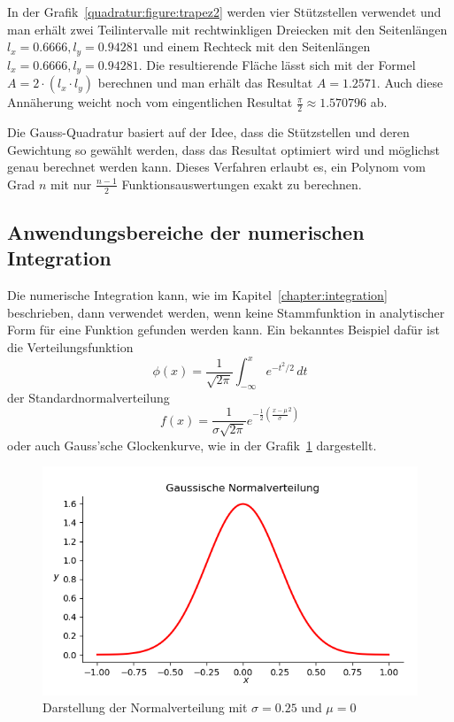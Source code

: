 \noindent
In der Grafik~\ref{quadratur:figure:trapez2} werden vier Stützstellen verwendet und man erhält zwei Teilintervalle mit 
rechtwinkligen Dreiecken mit den Seitenlängen $l_{x}=0.6666, l_{y}=0.94281$ und einem Rechteck mit den Seitenlängen
$l_{x}=0.6666, l_{y}=0.94281$. 
Die resultierende Fläche lässt sich mit der Formel $A= 2\cdot (l_{x} \cdot l_{y})$ berechnen 
und man erhält das Resultat $A=1.2571$.
Auch diese Annäherung weicht noch vom eingentlichen Resultat $\frac{\pi}{2} \approx 1.570796$ ab.

\noindent
Die Gauss-Quadratur basiert auf der Idee, dass die Stützstellen und deren Gewichtung so gewählt werden,
dass das Resultat optimiert wird und möglichst genau berechnet werden kann.
Dieses Verfahren erlaubt es, ein Polynom vom Grad $n$ mit nur $\frac{n-1}{2}$
Funktionsauswertungen exakt zu berechnen.

\newpage

\subsection{Anwendungsbereiche der numerischen Integration \label{quadratur:subsection:anwendungsbereiche}}
Die numerische Integration kann, wie im Kapitel~\ref{chapter:integration} beschrieben, dann verwendet
werden, wenn keine Stammfunktion in analytischer Form für eine Funktion gefunden werden kann.
Ein bekanntes Beispiel dafür ist die Verteilungsfunktion
\begin{equation}
    \phi(x) 
    =
    \frac{1}{\sqrt{2\pi}}
    \int_{-\infty}^x e^{-t^2/2}\,dt
\end{equation}
\noindent
der Standardnormalverteilung
\begin{equation}
    f(x)
    = 
    \frac{1}{\sigma \sqrt{2\pi}}e^{-\frac{1}{2}(\frac{x-\mu}{\sigma}^{2})}
\end{equation}
\noindent 
oder auch Gauss'sche Glockenkurve, wie in der Grafik~\ref{quadratur:figure:gaussdistribution} dargestellt. 

\begin{figure}[!h]
    \centering
    \includegraphics[scale=0.7]{papers/quadratur/figures/GaussDistribution1}
    \caption{Darstellung der Normalverteilung mit $\sigma=0.25$ und $\mu=0$
    \label{quadratur:figure:gaussdistribution}}
\end{figure}

